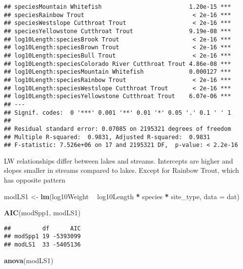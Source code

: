 \documentclass[
  landscape]{article}
\newenvironment{Shaded}{\begin{snugshade}}{\end{snugshade}}
\newcommand{\DataTypeTok}[1]{\textcolor[rgb]{0.13,0.29,0.53}{#1}}
\newcommand{\KeywordTok}[1]{\textcolor[rgb]{0.13,0.29,0.53}{\textbf{#1}}}
\newcommand{\NormalTok}[1]{#1}
\newcommand{\OperatorTok}[1]{\textcolor[rgb]{0.81,0.36,0.00}{\textbf{#1}}}
\newcommand{\StringTok}[1]{\textcolor[rgb]{0.31,0.60,0.02}{#1}}
\begin{document}
\begin{verbatim}
## speciesMountain Whitefish                         1.20e-15 ***
## speciesRainbow Trout                               < 2e-16 ***
## speciesWestslope Cutthroat Trout                   < 2e-16 ***
## speciesYellowstone Cutthroat Trout                9.19e-08 ***
## log10Length:speciesBrook Trout                     < 2e-16 ***
## log10Length:speciesBrown Trout                     < 2e-16 ***
## log10Length:speciesBull Trout                      < 2e-16 ***
## log10Length:speciesColorado River Cutthroat Trout 4.86e-08 ***
## log10Length:speciesMountain Whitefish             0.000127 ***
## log10Length:speciesRainbow Trout                   < 2e-16 ***
## log10Length:speciesWestslope Cutthroat Trout       < 2e-16 ***
## log10Length:speciesYellowstone Cutthroat Trout    6.07e-06 ***
## ---
## Signif. codes:  0 '***' 0.001 '**' 0.01 '*' 0.05 '.' 0.1 ' ' 1
## 
## Residual standard error: 0.07085 on 2195321 degrees of freedom
## Multiple R-squared:  0.9831, Adjusted R-squared:  0.9831 
## F-statistic: 7.526e+06 on 17 and 2195321 DF,  p-value: < 2.2e-16
\end{verbatim}

LW relationships differ between lakes and streams. Intercepts are higher
and slopes smaller in streams compared to lakes. Except for Rainbow
Trout, which has opposite pattern

\begin{Shaded}
\begin{Highlighting}[]
\NormalTok{modLS1 <-}\StringTok{ }\KeywordTok{lm}\NormalTok{(log10Weight }\OperatorTok{~}\StringTok{ }\NormalTok{log10Length }\OperatorTok{*}\StringTok{ }\NormalTok{species }\OperatorTok{*}\StringTok{ }\NormalTok{site_type, }\DataTypeTok{data =}\NormalTok{ dat)}

\KeywordTok{AIC}\NormalTok{(modSpp1, modLS1)}
\end{Highlighting}
\end{Shaded}

\begin{verbatim}
##         df      AIC
## modSpp1 19 -5393099
## modLS1  33 -5405136
\end{verbatim}

\begin{Shaded}
\begin{Highlighting}[]
\KeywordTok{anova}\NormalTok{(modLS1)}
\end{Highlighting}
\end{Shaded}
\end{document}
